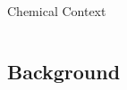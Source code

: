 \documentclass{beamer}
\newcommand{\tss}{\textsuperscript}
\begin{document}
\begin{frame}{Chemical Context}
\begin{columns}
\begin{column}{0.5\textwidth}
    \end{column}
  \end{columns}  
\end{frame}

\subsection{Background}





\end{document}
